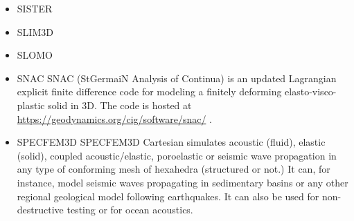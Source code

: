 \begin{itemize}
\item {\codefont SISTER} 

{\small
\noindent
\cite{olbm16}
}

\item {\codefont SLIM3D} 

{\small
\noindent
\cite{poso08}
\cite{qusp10}
\cite{brps12}
\cite{brps13}
\cite{brau13}
\cite{brun14}
\cite{hebr14}
\cite{kobf14}
\cite{clbq15}
\cite{brcr17}
\cite{basq18}\cite{osss18}\cite{osss18b}
}

\item {\codefont SLOMO} 

{\small
\noindent
\cite{kaus05}
\cite{kasb08}
}

\item {\codefont SNAC} 
SNAC (StGermaiN Analysis of Continua) is an updated Lagrangian explicit finite 
difference code for modeling a finitely deforming elasto-visco-plastic solid in 3D.
The code is hosted at \url{https://geodynamics.org/cig/software/snac/} .

{\small
\noindent
\cite{chlg08}
\cite{chgu08}
\cite{qula10}
\cite{chss11}
}

\item {\codefont SPECFEM3D} 
SPECFEM3D Cartesian simulates acoustic (fluid), elastic (solid), coupled acoustic/elastic, 
poroelastic or seismic wave propagation in any type of conforming mesh of hexahedra 
(structured or not.) It can, for instance, model seismic waves propagating in sedimentary 
basins or any other regional geological model following earthquakes. It can also be used 
for non-destructive testing or for ocean acoustics. 


\end{itemize}
